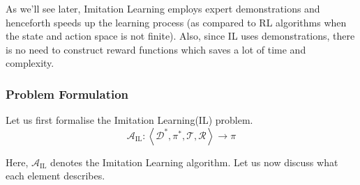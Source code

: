 \documentclass[11pt]{article}
\begin{document}
As we'll see later, Imitation Learning employs expert demonstrations and henceforth speeds up the learning process (as compared to RL algorithms when the state and action space is not finite). Also, since IL uses demonstrations, there is no need to construct reward functions which saves a lot of time and complexity.

\subsubsection{Problem Formulation}
\normalfont

Let us first formalise the Imitation Learning(IL) problem.
$$
\mathcal{A}_{\mathrm{IL}}:\left\langle\mathcal{D}^{*}, \pi^{*}, \mathcal{T}, \mathcal{R}\right\rangle \rightarrow \pi
$$

Here, $\mathcal{A}_{\mathrm{IL}}$ denotes the Imitation Learning algorithm.
Let us now discuss what each element describes. 
\end{document}
